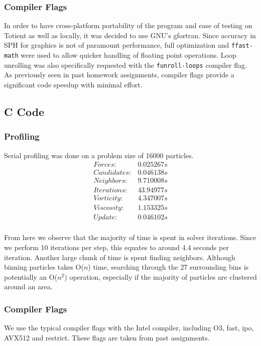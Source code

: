 \documentclass{scrartcl}
\begin{document}
  \subsubsection{Compiler Flags}
  In order to have cross-platform portability of the program and ease of testing on Totient as well as locally, it was decided to use GNU's gfortran. Since accuracy in SPH for graphics is not of paramount performance, full optimization and \texttt{ffast-math} were used to allow quicker handling of floating point operations. Loop unrolling was also specifically requested with the \texttt{funroll-loops} compiler flag. As previously seen in past homework assignments, compiler flags provide a significant code speedup with minimal effort.
 
          \subsection{C Code}
          \subsubsection{Profiling}
          
          Serial profiling was done on a problem size of 16000 particles.
          \[\begin{array}{lc}
          Forces:     & 0.025267 s \\
          Candidates: & 0.046138 s \\
          Neighbors:  & 9.710008 s \\
          Iterations: & 43.94977 s \\
          Vorticity:  & 4.347007 s \\
          Viscosity:  & 1.153325 s \\
          Update:     & 0.046102 s \\
          \end{array}\]
          
          From here we observe that the majority of time is spent in solver iterations. Since we perform 10 iterations per step, this equates to around 4.4 seconds per iteration. Another large chunk of time is spent finding neighbors. Although binning particles takes O($n$) time, searching through the 27 surrounding bins is potentially an O($n^2$) operation, especially if the majority of particles are clustered around an area.
          
          \subsubsection{Compiler Flags}
          We use the typical compiler flags with the Intel compiler, including O3, fast, ipo, AVX512 and restrict. These flags are taken from past assignments.
\end{document}
